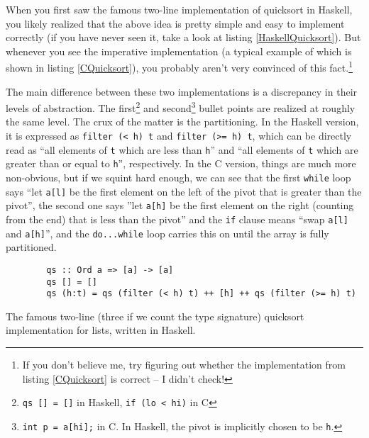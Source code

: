 \documentclass[declaration,mgr,english,shortabstract]{iithesis}
\newcommand{\m}[1]{\texttt{#1}}
\begin{document}
When you first saw the famous two-line implementation of quicksort in Haskell, you likely realized that the above idea is pretty simple and easy to implement correctly (if you have never seen it, take a look at listing \ref{HaskellQuicksort}). But whenever you see the imperative implementation (a typical example of which is shown in listing \ref{CQuicksort}), you probably aren't very convinced of this fact.\footnote{If you don't believe me, try figuring out whether the implementation from listing \ref{CQuicksort} is correct -- I didn't check!}

The main difference between these two implementations is a discrepancy in their levels of abstraction. The first\footnote{\m{qs\ []\ =\ []} in Haskell, \m{if\ (lo\ <\ hi)} in C} and second\footnote{\m{int\ p\ =\ a[hi];} in C. In Haskell, the pivot is implicitly chosen to be \m{h}.} bullet points are realized at roughly the same level. The crux of the matter is the partitioning. In the Haskell version, it is expressed as \m{filter (< h) t} and \m{filter (>= h) t}, which can be directly read as ``all elements of \m{t} which are less than \m{h}'' and ``all elements of \m{t} which are greater than or equal to \m{h}'', respectively. In the C version, things are much more non-obvious, but if we squint hard enough, we can see that the first \m{while} loop says ``let \m{a[l]} be the first element on the left of the pivot that is greater than the pivot'', the second one says ''let \m{a[h]} be the first element on the right (counting from the end) that is less than the pivot'' and the \m{if} clause means ``swap \m{a[l]} and \m{a[h]}'', and the \m{do...while} loop carries this on until the array is fully partitioned.

\begin{listing}[H]
    \begin{verbatim}
        qs :: Ord a => [a] -> [a]
        qs [] = []
        qs (h:t) = qs (filter (< h) t) ++ [h] ++ qs (filter (>= h) t)
    \end{verbatim}
    \caption{The famous two-line (three if we count the type signature) quicksort implementation for lists, written in Haskell.}
    \label{HaskellQuicksort}
\end{listing}
\end{document}
